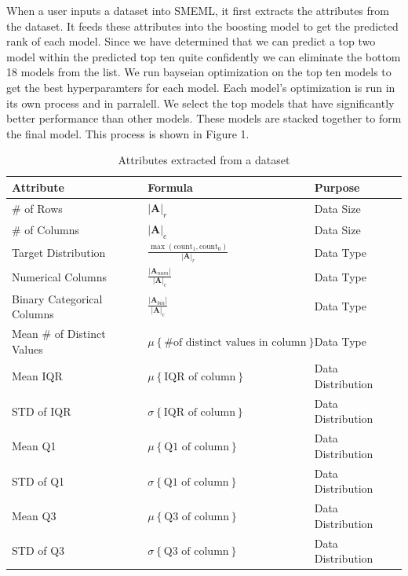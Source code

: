 \documentclass{article}
\begin{document}
When a user inputs a dataset into SMEML, it first extracts the attributes from the dataset. It feeds these attributes into the boosting model to get the predicted rank of each model. Since we have determined that we can predict a top two model within the predicted top ten quite confidently we can eliminate the bottom 18 models from the list. We run bayseian optimization on the top ten models to get the best hyperparamters for each model. Each model's optimization is run in its own process and in parralell. We select the top models that have significantly better performance than other models. These models are stacked together to form the final model. This process is shown in Figure 1.
\begin{table}
  \caption{Attributes extracted from a dataset}
  \label{model-options-table}
  \centering
  \begin{tabular}{lll}
    \toprule
    Attribute & Formula & Purpose\\
    \midrule
    \# of Rows & $|\mathbf{A}|_r$ & Data Size \\
    \hline
    \# of Columns & $|\mathbf{A}|_c$ & Data Size \\
    \hline
    Target Distribution &
    $\frac{\max(\text{count}_1, \text{count}_0)}{|\mathbf{A}|_r}$
    & Data Type \\
    \hline
    Numerical Columns &
    $\frac{|\mathbf{A}_{num}|}{|\mathbf{A}|_{c}}$
    & Data Type \\
    \hline
    Binary Categorical Columns &
    $\frac{|\mathbf{A}_{bin}|}{|\mathbf{A}|_{c}}$
    & Data Type \\
    \hline
    Mean \# of Distinct Values  & $\mu \left\{\text{\# of distinct values in column}\right\}$ & Data Type \\ 
    \hline
    Mean IQR  & $\mu \left\{\text{IQR of column}\right\}$ & Data Distribution \\ 
    \hline
    STD of IQR  & $\sigma \left\{\text{IQR of column}\right\}$ & Data Distribution \\
    \hline
    Mean Q1 & $\mu \left\{\text{Q1 of column}\right\}$ & Data Distribution \\
    \hline
    STD of Q1  & $\sigma \left\{\text{Q1 of column}\right\}$ & Data Distribution \\
    \hline
    Mean Q3  & $\mu \left\{\text{Q3 of column}\right\}$ & Data Distribution \\
    \hline
    STD of Q3  & $\sigma \left\{\text{Q3 of column}\right\}$ & Data Distribution \\

\end{tabular}
\end{table}
\end{document}
